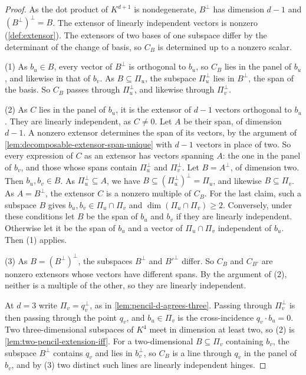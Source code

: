 \begin{proof}
  \leanok
  As the dot product of $K^{d+1}$ is nondegenerate, $B^{\perp}$ has
  dimension $d - 1$ and $(B^{\perp})^{\perp} = B$. The extensor of
  linearly independent vectors is nonzero (\cref{def:extensor}). The
  extensors of two bases of one subspace differ by the determinant of
  the change of basis, so $C_B$ is determined up to a nonzero scalar.

  (1) As $b_u \in B$, every vector of $B^{\perp}$ is orthogonal to
  $b_u$, so $C_B$ lies in the panel of $b_u$, and likewise in that of
  $b_v$. As $B \subseteq \Pi_u$, the subspace $\Pi_u^{\perp}$ lies in
  $B^{\perp}$, the span of the basis. So $C_B$ passes through
  $\Pi_u^{\perp}$, and likewise through $\Pi_v^{\perp}$.

  (2) As $C$ lies in the panel of $b_u$, it is the extensor of $d - 1$
  vectors orthogonal to $b_u$. They are linearly independent, as
  $C \neq 0$. Let $A$ be their span, of dimension $d - 1$. A nonzero
  extensor determines the span of its vectors, by the argument of
  \cref{lem:decomposable-extensor-span-unique} with $d - 1$ vectors in
  place of two. So every expression of $C$ as an extensor has vectors
  spanning $A$: the one in the panel of $b_v$, and those whose spans
  contain $\Pi_u^{\perp}$ and $\Pi_v^{\perp}$. Let $B = A^{\perp}$, of
  dimension two. Then $b_u, b_v \in B$. As
  $\Pi_u^{\perp} \subseteq A$, we have
  $B \subseteq (\Pi_u^{\perp})^{\perp} = \Pi_u$, and likewise
  $B \subseteq \Pi_v$. As $A = B^{\perp}$, the extensor $C$ is a nonzero
  multiple of $C_B$. For the last claim, such a subspace $B$ gives
  $b_u, b_v \in \Pi_u \cap \Pi_v$ and $\dim(\Pi_u \cap \Pi_v) \ge 2$.
  Conversely, under these conditions let $B$ be the span of $b_u$ and
  $b_v$ if they are linearly independent. Otherwise let it be the span
  of $b_u$ and a vector of $\Pi_u \cap \Pi_v$ independent of $b_u$. Then
  (1) applies.

  (3) As $B = (B^{\perp})^{\perp}$, the subspaces $B^{\perp}$ and
  $B'^{\perp}$ differ. So $C_B$ and $C_{B'}$ are nonzero extensors whose
  vectors have different spans. By the argument of (2), neither is a
  multiple of the other, so they are linearly independent.

  At $d = 3$ write $\Pi_v = q_v^{\perp}$, as in
  \cref{lem:pencil-d-agrees-three}. Passing through $\Pi_v^{\perp}$ is
  then passing through the point $q_v$, and $b_u \in \Pi_v$ is the
  cross-incidence $q_v \cdot b_u = 0$. Two three-dimensional subspaces
  of $K^4$ meet in dimension at least two, so (2) is
  \cref{lem:two-pencil-extension-iff}. For a two-dimensional
  $B \subseteq \Pi_v$ containing $b_v$, the subspace $B^{\perp}$ contains
  $q_v$ and lies in $b_v^{\perp}$, so $C_B$ is a line through $q_v$ in the
  panel of $b_v$, and by (3) two distinct such lines are linearly
  independent hinges.
\end{proof}


